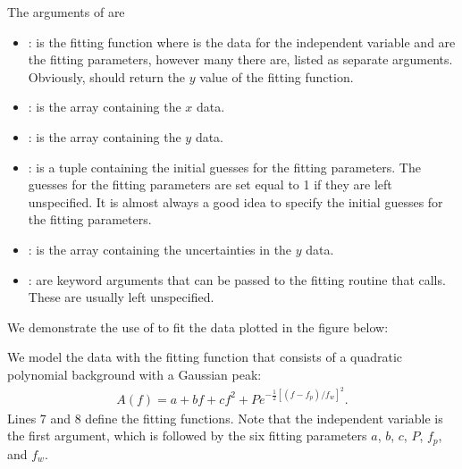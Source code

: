 \documentclass[letterpaper,10pt,english]{sphinxmanual}
\begin{document}
\sphinxAtStartPar
The arguments of  are
\begin{itemize}
\item {} 
\sphinxAtStartPar
{}: is the fitting function where  is the data for the independent variable and  are the fitting parameters, however many there are, listed as separate arguments.  Obviously,  should return the \(y\) value of the fitting function.

\item {} 
\sphinxAtStartPar
{}: is the array containing the \(x\) data.

\item {} 
\sphinxAtStartPar
{}: is the array containing the \(y\) data.

\item {} 
\sphinxAtStartPar
{}: is a tuple containing the initial guesses for the fitting parameters.  The guesses for the fitting parameters are set equal to 1 if they are left unspecified.  It is almost always a good idea to specify the initial guesses for the fitting parameters.

\item {} 
\sphinxAtStartPar
{}: is the array containing the uncertainties in the \(y\) data.

\item {} 
\sphinxAtStartPar
{}: are keyword arguments that can be passed to the fitting routine  that  calls.  These are usually left unspecified.

\end{itemize}

\sphinxAtStartPar
We demonstrate the use of  to fit the data plotted in the figure below:

\begin{figure}[htbp]
\centering

\noindent{}
\end{figure}

\sphinxAtStartPar
We model the data with the fitting function that consists of a quadratic polynomial background with a Gaussian peak:
\begin{equation*}
\begin{split}A(f) = a + bf + cf^2 + P e^{-\frac{1}{2}[(f-f_p)/f_w]^2} .\end{split}
\end{equation*}
\sphinxAtStartPar
Lines 7 and 8 define the fitting functions.  Note that the independent variable  is the first argument, which is followed by the six fitting parameters \(a\), \(b\), \(c\), \(P\), \(f_p\), and \(f_w\).
\end{document}
